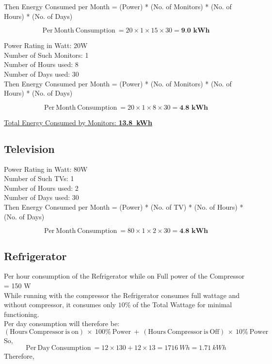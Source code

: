 \documentclass[11pt,a4paper]{article}
\begin{document}
Then Energy Consumed per Month = (Power) * (No. of Monitors) * (No. of Hours) * (No. of Days)

$$
\mathrm{Per\ Month\ Consumption\ } = 20 \times 1 \times 15 \times 30 = \textbf{9.0\ kWh}
$$

\noindent
Power Rating in Watt: 20W\\
Number of Such Monitors: 1\\
Number of Hours used: 8\\
Number of Days used: 30\\

Then Energy Consumed per Month = (Power) * (No. of Monitors) * (No. of Hours) * (No. of Days)

$$
\mathrm{Per\ Month\ Consumption\ } = 20 \times 1 \times 8 \times 30 = \textbf{4.8\ kWh}
$$

\underline{Total Energy Consumed by Monitors: \textbf{13.8\ kWh}}

\subsection{Television}

\noindent
Power Rating in Watt: 80W\\
Number of Such TVs: 1\\
Number of Hours used: 2\\
Number of Days used: 30\\

Then Energy Consumed per Month = (Power) * (No. of TV) * (No. of Hours) * (No. of Days)

$$
\mathrm{Per\ Month\ Consumption\ } = 80 \times 1 \times 2 \times 30 = \textbf{4.8\ kWh}
$$


\subsection{Refrigerator}
Per hour consumption of the Refrigerator while on Full power of the Compressor = 150 W\\

\noindent
While running with the compressor the Refrigerator consumes full wattage and without compressor, it consumes only $ 10 \% $ of the Total Wattage for minimal functioning.\\ 

Per day consumption will therefore be:
$$
\mathrm{(Hours\ Compressor\ is\ on)}\ \times\ 100\% \ \mathrm{Power}\ +\ \mathrm{(Hours\ Compressor\ is\ Off)}\ \times\ 10\%\ \mathrm{Power}
$$
\noindent
So, 
$$
\mathrm{Per\ Day\ Consumption\ } = 12 \times 130 + 12 \times 13 = 1716\ Wh = 1.71\ kWh
$$
\noindent
Therefore, 
\end{document}
